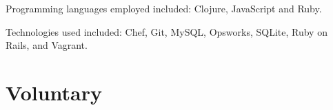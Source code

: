 \documentclass[margintitle,line]{res}
\renewcommand{\subsection}[1]{\section{\normalfont #1}}
\begin{document}
\begin{resume}
\begin{position}
 Programming languages employed included: Clojure, JavaScript and Ruby.

 Technologies used included: Chef, Git, MySQL, Opsworks, SQLite,
 Ruby on Rails, and Vagrant.
\end{position}




%
\subsection{Voluntary}


\end{resume}
\end{document}

